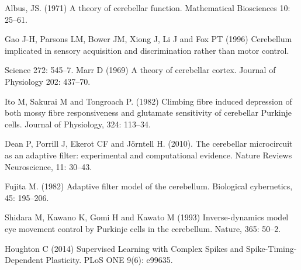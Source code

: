 \documentclass[11pt,a4paper]{scrartcl}
\begin{document}
\begin{thebibliography}{10}

Albus, JS. (1971) A theory of cerebellar function. 
\newblock Mathematical Biosciences 10: 25--61.

Gao J-H, Parsons LM, Bower JM, Xiong J, Li J and Fox PT (1996) Cerebellum implicated in sensory acquisition and discrimination rather than motor control.

\newblock Science 272: 545--7. 
Marr D (1969) A theory of cerebellar cortex.
\newblock Journal of Physiology 202: 437--70.

Ito M, Sakurai M and Tongroach P. (1982) Climbing fibre induced depression of both mossy fibre responsiveness and glutamate sensitivity of cerebellar Purkinje cells. 
\newblock Journal of Physiology, 324: 113--34.

Dean P, Porrill J, Ekerot CF and J\"{o}rntell H. (2010). The cerebellar microcircuit as an adaptive filter: experimental and computational evidence. 
\newblock Nature Reviews Neuroscience, 11: 30--43.

Fujita M. (1982) Adaptive filter model of the cerebellum. 
\newblock Biological cybernetics, 45: 195--206.


Shidara M, Kawano K, Gomi H and Kawato M (1993) Inverse-dynamics model eye movement control by Purkinje cells in the cerebellum.
\newblock Nature, 365: 50--2.

 Houghton C (2014) Supervised Learning with Complex Spikes and Spike-Timing-Dependent Plasticity. 
\newblock PLoS ONE 9(6): e99635. 

\end{thebibliography}
\end{document}
